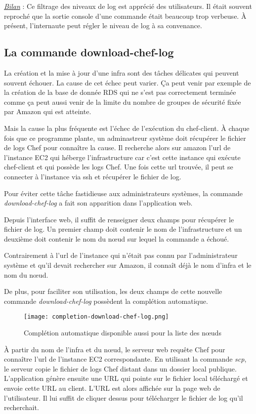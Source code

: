\underline{\textit{Bilan}} : Ce filtrage des niveaux de log est apprécié des
utilisateurs. Il était souvent reproché que la sortie console d'une commande
était beaucoup trop verbeuse. À présent, l'internaute peut régler le niveau de
log à sa convenance.

\subsection{La commande download-chef-log}
La création et la mise à jour d'une infra sont des tâches délicates qui peuvent
souvent échouer.
La cause de cet échec peut varier.
Ça peut venir par exemple de la création de la base de donnée RDS qui ne s'est
pas correctement terminée comme ça peut aussi venir de la limite du nombre de
groupes de sécurité fixée par Amazon qui est atteinte.

Mais la cause la plus fréquente est l'échec de l'exécution du chef-client.
À chaque fois que ce programme plante, un adminastreur système doit récupérer le
fichier de logs Chef pour connaître la cause. Il recherche alors sur amazon
l'url de l'instance EC2 qui héberge l'infrastructure car c'est cette instance
qui exécute chef-client et qui possède les logs Chef. Une fois cette url
trouvée, il peut se connecter à l'instance via ssh et récupérer le fichier de
log.

Pour éviter cette tâche fastidieuse aux administrateurs systèmes, la commande
\textit{download-chef-log} a fait son apparition dans l'application web.

Depuis l'interface web, il suffit de renseigner deux champs pour récupérer le
fichier de log. Un premier champ doit contenir le nom de l'infrastructure et un
deuxième doit contenir le nom du nœud sur lequel la commande a échoué.

Contrairement à l'url de l'instance qui n'était pas connu par l'administrateur
système et qu'il devait rechercher sur Amazon, il connaît déjà le nom d'infra et
le nom du nœud.

De plus, pour faciliter son utilisation, les deux champs de cette nouvelle
commande \textit{download-chef-log} possèdent la complétion automatique.

\begin{figure}[H]
  \texttt{[image: completion-download-chef-log.png]}
  \caption{Complétion automatique disponible aussi pour la liste des nœuds}
\end{figure}

À partir du nom de l'infra et du nœud, le serveur web requête Chef pour
connaître l'url de l'instance EC2 correspondante. En utilisant la commande
\textit{scp}, le serveur copie le fichier de logs Chef distant dans un
dossier local publique.
L'application génère ensuite une URL qui pointe sur le fichier local téléchargé
et envoie cette URL au client.
L'URL est alors affichée sur la page web de l'utilisateur. Il lui suffit de
cliquer dessus pour télécharger le fichier de log qu'il recherchait.


